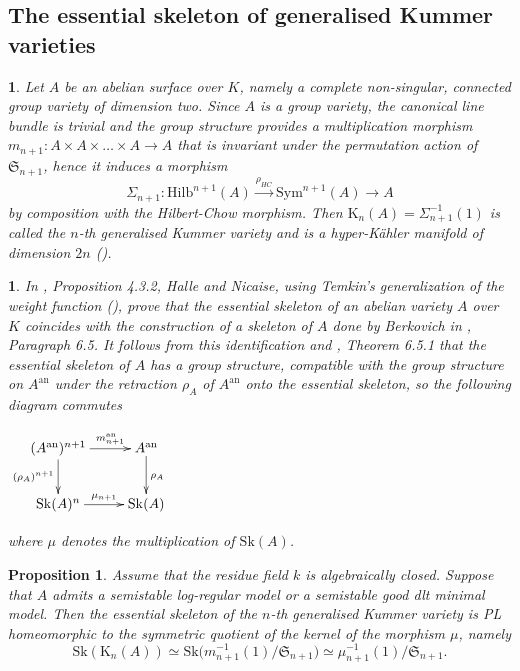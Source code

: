 \documentclass{amsart}%
\numberwithin{equation}{subsection}
\theoremstyle{plain2}
\newtheorem{prop}[equation]{Proposition}
\theoremstyle{definition2}
\theoremstyle{stepstyle}
\theoremstyle{point}
\theoremstyle{subpoint}
\newtheorem{subpoint}[equation]{}%
\newcommand{\spa}[1]{\begin{subpoint}#1\end{subpoint}}           %
\newcommand{\Hilb}{\ensuremath{\mathrm{Hilb}}}
\newcommand{\an}{\mathrm{an}}
\newcommand{\Sk}{\mathrm{Sk}}
\begin{document}
\subsection{The essential skeleton of generalised Kummer varieties} \label{sect essential sk Kummer}
\spa{Let $A$ be an abelian surface over $K$, namely a complete non-singular, connected group variety of dimension two. Since $A$ is a group variety, the canonical line bundle is trivial and the group structure provides a multiplication morphism $m_{n+1}: A \times A \times \ldots \times A \rightarrow A$ that is invariant under the permutation action of $\mathfrak{S}_{n+1}$, hence it induces a morphism $$\Sigma_{n+1}: \Hilb^{n+1}(A) \xrightarrow{\rho_{HC}} \text{Sym}^{n+1}(A) \rightarrow A$$ by composition with the Hilbert-Chow morphism. Then $\text{K}_n(A) = \Sigma_{n+1}^{-1}(1)$ is called the $n$-th generalised Kummer variety and is a hyper-K\"{a}hler manifold of dimension $2n$ (\cite{Beauville1983}).
}
\spa{In \cite{HalvardHalleNicaise2017}, Proposition 4.3.2, Halle and Nicaise, using Temkin's generalization of the weight function (\cite{Temkina}), prove that the essential skeleton of an abelian variety $A$ over $K$ coincides with the construction of a skeleton of $A$ done by Berkovich in \cite{Berkovich1990}, Paragraph 6.5. It follows from this identification and \cite{Berkovich1990}, Theorem 6.5.1 that the essential skeleton of $A$ has a group structure, compatible with the group structure on $A^\an$ under the retraction $\rho_A$ of $A^\an$ onto the essential skeleton, so the following diagram commutes
\begin{center}
$\xymatrix{
(A^\an)^{n+1} \ar[d]_{(\rho_A)^{n+1}} \ar[r]^-{m_{n+1}^\an} & A^\an \ar[d]^{\rho_A} \\
\Sk(A)^n \ar[r]^-{\mu_{n+1}} & \Sk(A)
}$
\end{center} where $\mu$ denotes the multiplication of $\Sk(A)$.
}
\begin{prop} \label{prop essential skeleton Kummer}
Assume that the residue field $k$ is algebraically closed.  Suppose that $A$ admits a semistable log-regular model or a semistable good dlt minimal model. Then the essential skeleton of the $n$-th generalised Kummer variety is PL homeomorphic to the symmetric quotient of the kernel of the morphism $\mu$, namely $$\Sk(\text{K}_n(A)) \simeq \Sk\big(m_{n+1}^{-1}(1)/\mathfrak{S}_{n+1}\big) \simeq \mu_{n+1}^{-1}(1)/\mathfrak{S}_{n+1}.$$ 
\end{prop}
\end{document}
